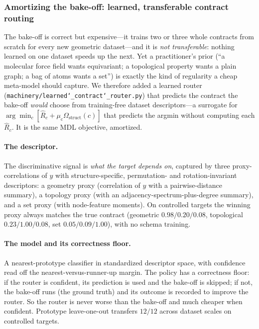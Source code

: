 \documentclass[11pt]{article}
\newcommand{\allowbreakhere}{\discretionary{}{}{}}
\newcommand{\code}[1]{\texttt{\def\_{\char`_\allowbreakhere}#1}}
\begin{document}
\subsubsection{Amortizing the bake-off: learned, transferable contract routing}
\label{sec:learned-routing}

The bake-off is correct but expensive---it trains two or three whole contracts from scratch for every new
geometric dataset---and it is \emph{not transferable}: nothing learned on one dataset speeds up the next.
Yet a practitioner's prior (``a molecular force field wants equivariant; a topological property wants a
plain graph; a bag of atoms wants a set'') is exactly the kind of regularity a cheap meta-model should
capture. We therefore added a learned router (\code{machinery/learned\_contract\_router.py}) that predicts
the contract the bake-off \emph{would} choose from training-free dataset descriptors---a surrogate for
$\arg\min_c[\widehat R_c+\mu_{\mathrm c}\Omega_{\mathrm{struct}}(c)]$ that predicts the argmin without
computing each $\widehat R_c$. It is the same MDL objective, amortized.

\paragraph{The descriptor.} The discriminative signal is \emph{what the target depends on}, captured by
three proxy-correlations of $y$ with structure-specific, permutation- and rotation-invariant descriptors:
a geometry proxy (correlation of $y$ with a pairwise-distance summary), a topology proxy (with an
adjacency-spectrum-plus-degree summary), and a set proxy (with node-feature moments). On controlled
targets the winning proxy always matches the true contract (geometric $0.98/0.20/0.08$, topological
$0.23/1.00/0.08$, set $0.05/0.09/1.00$), with no schema training.

\paragraph{The model and its correctness floor.} A nearest-prototype classifier in standardized
descriptor space, with confidence read off the nearest-versus-runner-up margin. The policy has a
correctness floor: if the router is confident, its prediction is used and the bake-off is skipped; if not,
the bake-off runs (the ground truth) and its outcome is recorded to improve the router. So the router is
never worse than the bake-off and much cheaper when confident. Prototype leave-one-out transfers $12/12$
across dataset scales on controlled targets.
\end{document}
